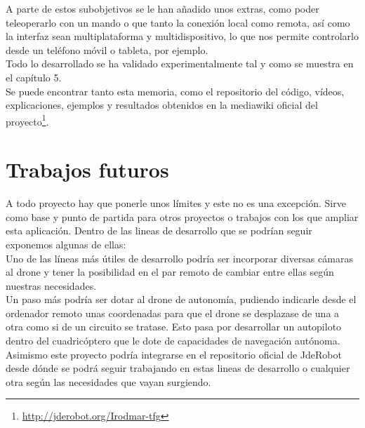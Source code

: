 A parte de estos subobjetivos se le han añadido unos extras, como poder teleoperarlo con un mando o que tanto la conexión local como remota, así como la interfaz sean multiplataforma y multidispositivo, lo que nos permite controlarlo desde un teléfono móvil o tableta, por ejemplo.\\

Todo lo desarrollado se ha validado experimentalmente tal y como se muestra en el capítulo 5.\\

Se puede encontrar tanto esta memoria, como el repositorio del código, vídeos, explicaciones, ejemplos y resultados obtenidos en la mediawiki oficial del proyecto\footnote{\url{http://jderobot.org/Irodmar-tfg}}\cite{Mediawiki}.\\

\section{Trabajos futuros}

A todo proyecto hay que ponerle unos límites y este no es una excepción. Sirve como base y punto de partida para otros proyectos o trabajos con los que ampliar esta aplicación. Dentro de las lineas de desarrollo que se podrían seguir exponemos algunas de ellas:\\

Uno de las líneas más útiles de desarrollo podría ser incorporar diversas cámaras al drone y tener la posibilidad en el par remoto de cambiar entre ellas según nuestras necesidades.\\

Un paso más podría ser dotar al drone de autonomía, pudiendo indicarle desde el ordenador remoto unas coordenadas para que el drone se desplazase de una a otra como si de un circuito se tratase. Esto pasa por desarrollar un autopiloto dentro del cuadricóptero que le dote de capacidades de navegación autónoma.\\

Asimismo este proyecto podría integrarse en el repositorio oficial de JdeRobot\cite{jderobot_repo} desde dónde se podrá seguir trabajando en estas lineas de desarrollo o cualquier otra según las necesidades que vayan surgiendo.\\

